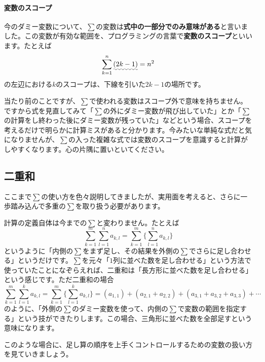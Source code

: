 \paragraph{変数のスコープ}

今のダミー変数について、$\sum$の変数は\textbf{式中の一部分でのみ意味がある}と言いました。この変数が有効な範囲を、プログラミングの言葉で\textbf{変数のスコープ}といいます。たとえば
\[
\sum_{k=1}^n \uwave{(2k - 1)} = n^2
\]
の左辺における$k$のスコープは、下線を引いた$2k-1$の場所です。

当たり前のことですが、$\sum$で使われる変数はスコープ外で意味を持ちません。ですから式を見直してみて「$\sum$の外にダミー変数が飛び出していた」とか「$\sum$の計算をし終わった後にダミー変数が残っていた」などという場合、スコープを考えるだけで明らかに計算ミスがあると分かります。今みたいな単純な式だと気になりませんが、$\sum$の入った複雑な式では変数のスコープを意識すると計算がしやすくなります。心の片隅に置いといてください。

\subsection{二重和}

ここまで$\sum$の使い方を色々説明してきましたが、実用面を考えると、さらに一歩踏み込んで多重の$\sum$を取り扱う必要があります。

計算の定義自体は今までの$\sum$と変わりません。たとえば
\[
\sum_{k = 1}^m \sum_{l  = 1}^n a_{k,l} = \sum_{k = 1}^m \Biggl\{\sum_{l  = 1}^n a_{k,l}\Biggr\}
\]
というように「内側の$\sum$をまず足し、その結果を外側の$\sum$でさらに足し合わせる」というだけです。$\sum$を元々「$1$列に並べた数を足し合わせる」という方法で使っていたことになぞらえれば、二重和は「長方形に並べた数を足し合わせる」という感じです。ただ二重和の場合
\[
\sum_{k = 1}^m \sum_{l  = 1}^k a_{k,l} = \sum_{k = 1}^m \Biggl\{\sum_{l  = 1}^k a_{k, l}\Biggr\} = (a_{1, 1}) + (a_{2, 1} + a_{2, 2}) + (a_{3, 1} + a_{3, 2} + a_{3, 3}) + \cdots
\]
のように、「外側の$\sum$のダミー変数を使って、内側の$\sum$で変数の範囲を指定する」という技ができたりします。この場合、三角形に並べた数を全部足すという意味になります。

このような場合に、足し算の順序を上手くコントロールするための変数の扱い方を見ていきましょう。

